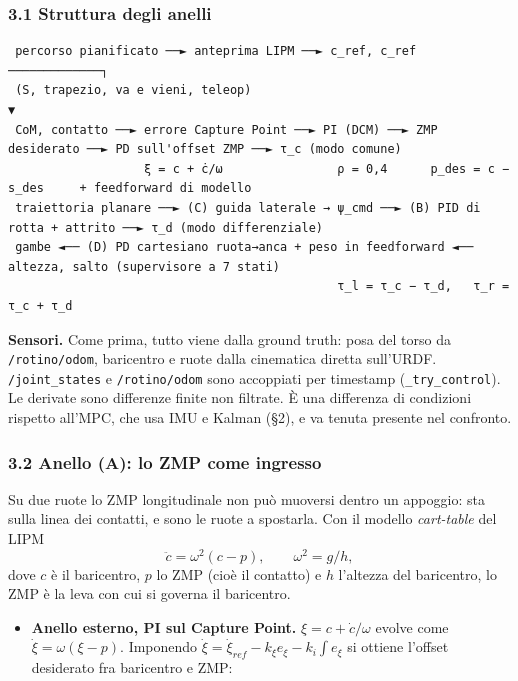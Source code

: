 \documentclass[
]{article}
\providecommand{\tightlist}{%
  \setlength{\itemsep}{0pt}\setlength{\parskip}{0pt}}
\begin{document}
\subsubsection{3.1 Struttura degli anelli}\label{31-struttura-degli-anelli}

\begin{verbatim}
 percorso pianificato ──► anteprima LIPM ──► c_ref, c_ref ─────────────┐
 (S, trapezio, va e vieni, teleop)                                    ▼
 CoM, contatto ──► errore Capture Point ──► PI (DCM) ──► ZMP desiderato ──► PD sull'offset ZMP ──► τ_c (modo comune)
                   ξ = c + ċ/ω                ρ = 0,4      p_des = c − s_des     + feedforward di modello
 traiettoria planare ──► (C) guida laterale → ψ_cmd ──► (B) PID di rotta + attrito ──► τ_d (modo differenziale)
 gambe ◄── (D) PD cartesiano ruota→anca + peso in feedforward ◄── altezza, salto (supervisore a 7 stati)
                                              τ_l = τ_c − τ_d,   τ_r = τ_c + τ_d
\end{verbatim}

\textbf{Sensori.} Come prima, tutto viene dalla ground truth: posa del torso da \texttt{/rotino/odom}, baricentro e ruote dalla cinematica diretta sull'URDF. \texttt{/joint\_states} e \texttt{/rotino/odom} sono accoppiati per timestamp (\texttt{\_try\_control}). Le derivate sono differenze finite non filtrate. È una differenza di condizioni rispetto all'MPC, che usa IMU e Kalman (§2), e va tenuta presente nel confronto.

\subsubsection{3.2 Anello (A): lo ZMP come ingresso}\label{32-anello-a-lo-zmp-come-ingresso}

Su due ruote lo ZMP longitudinale non può muoversi dentro un appoggio: sta sulla linea dei contatti, e sono le ruote a spostarla. Con il modello \emph{cart-table} del LIPM \[\ddot c = \omega^2 (c - p),\qquad \omega^2 = g/h,\] dove \(c\) è il baricentro, \(p\) lo ZMP (cioè il contatto) e \(h\) l'altezza del baricentro, lo ZMP è la leva con cui si governa il baricentro.

\begin{itemize}
\tightlist
\item \textbf{Anello esterno, PI sul Capture Point.} \(\xi = c + \dot c/\omega\) evolve come \(\dot\xi = \omega(\xi - p)\). Imponendo \(\dot\xi = \dot\xi_{ref} - k_\xi e_\xi - k_i\!\int e_\xi\) si ottiene l'offset desiderato fra baricentro e ZMP:
\end{itemize}
\end{document}
